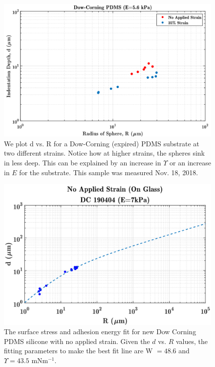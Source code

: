 \begin{figure}[h]
	\centering
	\includegraphics[width=\linewidth]{Chapters/Figures/d_vs_r_stretch_vs_nostretch.pdf}
	\caption[D vs. R Dow-Corning]{We plot d vs. R for a Dow-Corning (expired) PDMS substrate at two different strains. Notice how at higher strains, the spheres sink in less deep. This can be explained by an increase in $\Upsilon$ or an increase in $E$ for the substrate. This sample was measured Nov. 18, 2018.}
	\label{fig:dvsrstretchvsnostretchdc181115}
\end{figure}

\begin{figure}[h]
	\centering
	\includegraphics[width=\linewidth]{Chapters/Figures/WUps_fit_DC190404}
	\caption[Dow Corning W-$\Upsilon $ Fit]{The surface stress and adhesion energy fit for new Dow Corning PDMS silicone with no applied strain. Given the $ d $ vs. $ R $ values, the fitting parameters to make the best fit line are W $ = 48.6$ and  $\Upsilon = 43.5$ mNm$^{-1}$.}
	\label{fig:wupsfitdc190404}
\end{figure}

